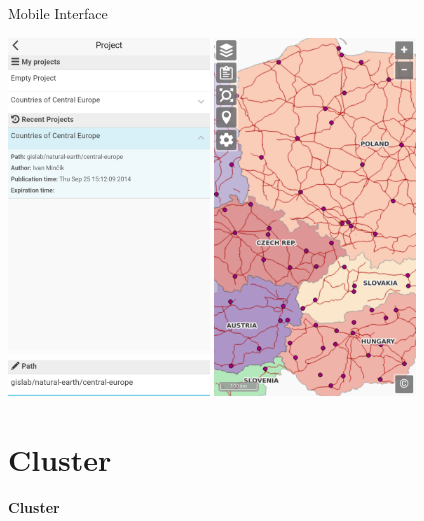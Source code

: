 \documentclass[12pt]{beamer}
\begin{document}
\begin{frame}[plain]{Mobile Interface}
	\begin{center}
		\includegraphics[keepaspectratio=true,width=0.4\textwidth]{images/gislab-mobile.png}\hspace*{0.5cm}
		\includegraphics[keepaspectratio=true,width=0.4\textwidth]{images/gislab-mobile-3.png}
	\end{center}
\end{frame}


\section{Cluster}
\begin{frame}
	\begin{center}
		\LARGE\textbf{Cluster}	
	\end{center}
\end{frame}
\end{document}
